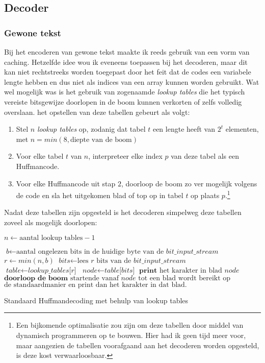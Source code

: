\subsection{Decoder}

\subsubsection{Gewone tekst}
Bij het encoderen van gewone tekst maakte ik reeds gebruik van een vorm van caching. Hetzelfde idee wou ik eveneens toepassen bij het decoderen, maar dit kan niet rechtstreeks worden toegepast door het feit dat de codes een variabele lengte hebben en dus niet als indices van een array kunnen worden gebruikt. Wat wel mogelijk was is het gebruik van zogenaamde \emph{lookup tables} die het typisch vereiste bitsgewijze doorlopen in de boom kunnen verkorten of zelfs volledig overslaan. het opstellen van deze tabellen gebeurt als volgt:
\begin{enumerate}
	\item Stel $n$ \emph{lookup tables} op, zodanig dat tabel $t$ een lengte heeft van $2^t$ elementen, met $n = min(8, \text{diepte van de boom})$
	\item Voor elke tabel $t$ van $n$, interpreteer elke index $p$ van deze tabel als een Huffmancode.
	\item Voor elke Huffmancode uit stap $2$, doorloop de boom zo ver mogelijk volgens de code en sla het uitgekomen blad of top op in tabel $t$ op plaats $p$.\footnote{Een bijkomende optimalisatie zou zijn om deze tabellen door middel van dynamisch programmeren op te bouwen. Hier had ik geen tijd meer voor, maar aangezien de tabellen voorafgaand aan het decoderen worden opgesteld, is deze kost verwaarloosbaar.}
\end{enumerate}
Nadat deze tabellen zijn opgesteld is het decoderen simpelweg deze tabellen zoveel als mogelijk doorlopen:
\begin{algorithm}
	\begin{algorithmic}[1]
		\State $\textit{n} \gets \text{aantal lookup tables} - 1$
		
		\State $\textit{b} \gets \text{aantal ongelezen bits in de huidige byte van de }\textit{bit\_input\_stream}$
		\State $\textit{r} \gets min(n, b)$
		\State $\textit{bits} \gets \text{lees }\textit{r}\text{ bits van de } \textit{bit\_input\_stream}$
		\State $\textit{table} \gets \textit{lookup\_tables[r]}$
		\State $\textit{node} \gets \textit{table[bits]}$
			\State $\textbf{print}\text{ het karakter in blad }\textit{node}$
		\Else
			\State $\textbf{doorloop de boom}\text{ startende vanaf }\textit{node}\text{ tot een blad wordt bereikt op}$
			\State $\text{de standaardmanier en print dan het karakter in dat blad.}$
		\EndIf
		\EndProcedure
	\end{algorithmic}
	\caption{Standaard Huffmandecoding met behulp van lookup tables}
\end{algorithm}


